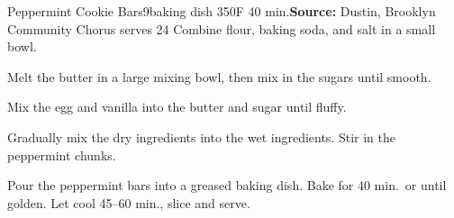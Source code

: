 \begin{recipe}{Peppermint Cookie Bars}{9\inch{}\inch baking dish \hfill 350\0F \hfill 40 min.}{\textbf{Source:} Dustin, Brooklyn Community Chorus \hfill serves 24}
 Combine flour, baking soda, and salt in a small bowl.

 Melt the butter in a large mixing bowl, then mix in the sugars until smooth.

 Mix the egg and vanilla into the butter and sugar until fluffy.

 Gradually mix the dry ingredients into the wet ingredients. Stir in the peppermint chunks.

 \newstep Pour the peppermint bars into a greased baking dish. Bake for 40 min.\ or until golden. Let cool 45--60 min., slice and serve.
\end{recipe}
